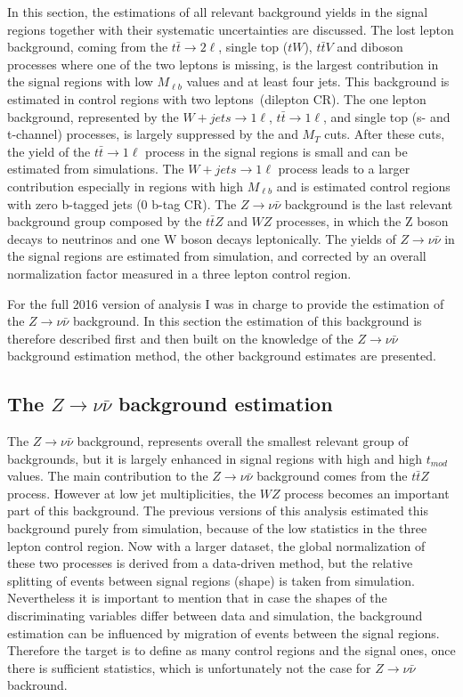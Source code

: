 In this section, the estimations of all relevant background yields in the signal regions together with their systematic uncertainties are discussed. The lost lepton background, coming from the $t\bar{t} \to 2 \ell$, single top ($tW$), $t\bar{t}V$ and diboson processes where one of the two leptons is missing, is the largest contribution in the signal regions with low $M_{\ell b}$ values and at least four jets. This background is estimated in control regions with two leptons~(dilepton CR). The one lepton background, represented by the $W+jets \to 1\ell$, $t\bar{t} \to 1\ell$, and single top (s- and t-channel) processes, is largely suppressed by the \MET and $M_{T}$ cuts. After these cuts, the yield of the $t\bar{t} \to 1\ell$ process in the signal regions is small and can be estimated from simulations. The $W+jets \to 1\ell$  process leads to a larger contribution especially in regions with high $M_{\ell b}$ and is estimated control regions with zero b-tagged jets (0 b-tag CR). The $Z \to \nu \bar{\nu}$ background is the last relevant background group composed by the $t\bar{t}Z$ and $WZ$ processes, in which the Z boson decays to neutrinos and one W boson decays leptonically. The yields of $Z \to \nu \bar{\nu}$ in the signal regions are estimated from simulation, and corrected by an overall normalization factor measured in a three lepton control region.  

For the full 2016 version of analysis I was in charge to provide the estimation of the $Z \to \nu \bar{\nu}$ background. In this section the estimation of this background is therefore described first and then built on the knowledge of the $Z \to \nu \bar{\nu}$ background estimation method, the other background estimates are presented.


\subsection{The $Z \to \nu \bar{\nu}$ background estimation}

The $Z \to \nu \bar{\nu}$ background,  represents overall the smallest relevant group of backgrounds, but it is largely enhanced in signal regions with high \MET and high $t_{mod}$ values. The main contribution to the $Z \to \nu \bar{\nu}$ background comes from the $t\bar{t}Z$ process. However at low jet multiplicities, the $WZ$ process becomes an important part of this background.  The previous versions of this analysis estimated this background purely from simulation, because of the low statistics in the three lepton control region. Now with a larger dataset, the global normalization of these two processes is derived from a data-driven method, but the relative splitting of events between signal regions (shape) is taken from simulation. Nevertheless it is important to mention that in case the shapes of the discriminating variables differ between data and simulation, the background estimation can be influenced by migration of events between the signal regions. Therefore the target is to define as many control regions and the signal ones, once there is sufficient statistics, which is unfortunately not the case for $Z \to \nu \bar{\nu}$ backround. 

